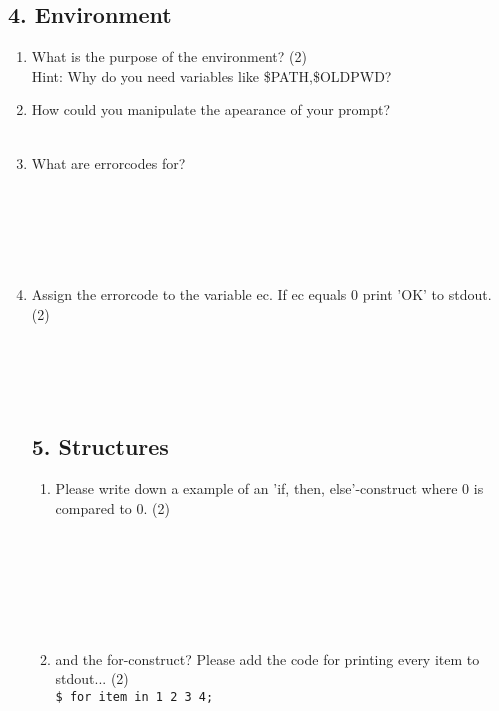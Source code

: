 \documentclass[11pt]{article}
\begin{document}
\begin{enumerate}
\subsection{4. Environment}
\begin{enumerate}
    \item What is the purpose of the environment? (2) \\
    Hint: Why do you need variables like \$PATH,\$OLDPWD?
    \item How could you manipulate the apearance of your prompt? \\
    \\
    \item What are errorcodes for? \\
    \\
    \\
    \\
    \\
    \\
    \item Assign the errorcode to the variable ec. If ec equals 0 print 'OK' to stdout. (2) \\
    \\
    \\
    \\
    \\
\subsection*{5. Structures}
\begin{enumerate}
    \item Please write down a example of an 'if, then, else'-construct where 0 is compared to 0. (2) \\
    \\
    \\
    \\
    \\
    \\
    \\
    \item and the for-construct? Please add the code for printing every item to stdout... (2) \\
    \texttt{\$ for item in 1 2 3 4;}
\end{enumerate}
\end{enumerate}
    
\end{enumerate}
\end{document}
